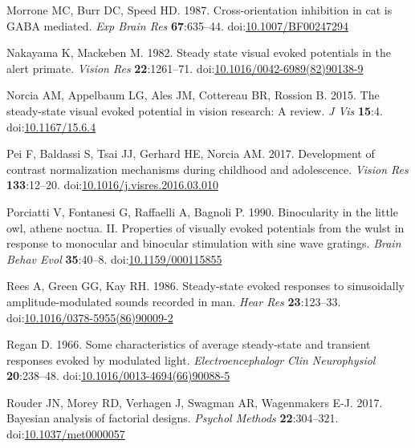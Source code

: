 \documentclass[]{article}
\begin{document}
\leavevmode\hypertarget{ref-Morrone1987}{}%
Morrone MC, Burr DC, Speed HD. 1987. Cross-orientation inhibition in cat is GABA mediated. \emph{Exp Brain Res} \textbf{67}:635--44. doi:\href{https://doi.org/10.1007/BF00247294}{10.1007/BF00247294}

\leavevmode\hypertarget{ref-Nakayama1982}{}%
Nakayama K, Mackeben M. 1982. Steady state visual evoked potentials in the alert primate. \emph{Vision Res} \textbf{22}:1261--71. doi:\href{https://doi.org/10.1016/0042-6989(82)90138-9}{10.1016/0042-6989(82)90138-9}

\leavevmode\hypertarget{ref-Norcia2015}{}%
Norcia AM, Appelbaum LG, Ales JM, Cottereau BR, Rossion B. 2015. The steady-state visual evoked potential in vision research: A review. \emph{J Vis} \textbf{15}:4. doi:\href{https://doi.org/10.1167/15.6.4}{10.1167/15.6.4}

\leavevmode\hypertarget{ref-Pei2017}{}%
Pei F, Baldassi S, Tsai JJ, Gerhard HE, Norcia AM. 2017. Development of contrast normalization mechanisms during childhood and adolescence. \emph{Vision Res} \textbf{133}:12--20. doi:\href{https://doi.org/10.1016/j.visres.2016.03.010}{10.1016/j.visres.2016.03.010}

\leavevmode\hypertarget{ref-Porciatti1990}{}%
Porciatti V, Fontanesi G, Raffaelli A, Bagnoli P. 1990. Binocularity in the little owl, athene noctua. II. Properties of visually evoked potentials from the wulst in response to monocular and binocular stimulation with sine wave gratings. \emph{Brain Behav Evol} \textbf{35}:40--8. doi:\href{https://doi.org/10.1159/000115855}{10.1159/000115855}

\leavevmode\hypertarget{ref-Rees1986}{}%
Rees A, Green GG, Kay RH. 1986. Steady-state evoked responses to sinusoidally amplitude-modulated sounds recorded in man. \emph{Hear Res} \textbf{23}:123--33. doi:\href{https://doi.org/10.1016/0378-5955(86)90009-2}{10.1016/0378-5955(86)90009-2}

\leavevmode\hypertarget{ref-Regan1966}{}%
Regan D. 1966. Some characteristics of average steady-state and transient responses evoked by modulated light. \emph{Electroencephalogr Clin Neurophysiol} \textbf{20}:238--48. doi:\href{https://doi.org/10.1016/0013-4694(66)90088-5}{10.1016/0013-4694(66)90088-5}

\leavevmode\hypertarget{ref-Rouder2017}{}%
Rouder JN, Morey RD, Verhagen J, Swagman AR, Wagenmakers E-J. 2017. Bayesian analysis of factorial designs. \emph{Psychol Methods} \textbf{22}:304--321. doi:\href{https://doi.org/10.1037/met0000057}{10.1037/met0000057}
\end{document}

